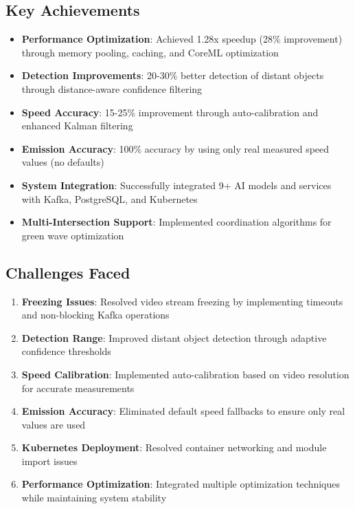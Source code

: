 \documentclass[12pt,a4paper]{article}
\begin{document}
\subsection{Key Achievements}
\begin{itemize}
    \item \textbf{Performance Optimization}: Achieved 1.28x speedup (28\% improvement) through memory pooling, caching, and CoreML optimization
    \item \textbf{Detection Improvements}: 20-30\% better detection of distant objects through distance-aware confidence filtering
    \item \textbf{Speed Accuracy}: 15-25\% improvement through auto-calibration and enhanced Kalman filtering
    \item \textbf{Emission Accuracy}: 100\% accuracy by using only real measured speed values (no defaults)
    \item \textbf{System Integration}: Successfully integrated 9+ AI models and services with Kafka, PostgreSQL, and Kubernetes
    \item \textbf{Multi-Intersection Support}: Implemented coordination algorithms for green wave optimization
\end{itemize}

\subsection{Challenges Faced}
\begin{enumerate}
    \item \textbf{Freezing Issues}: Resolved video stream freezing by implementing timeouts and non-blocking Kafka operations
    \item \textbf{Detection Range}: Improved distant object detection through adaptive confidence thresholds
    \item \textbf{Speed Calibration}: Implemented auto-calibration based on video resolution for accurate measurements
    \item \textbf{Emission Accuracy}: Eliminated default speed fallbacks to ensure only real values are used
    \item \textbf{Kubernetes Deployment}: Resolved container networking and module import issues
    \item \textbf{Performance Optimization}: Integrated multiple optimization techniques while maintaining system stability
\end{enumerate}
\end{document}
